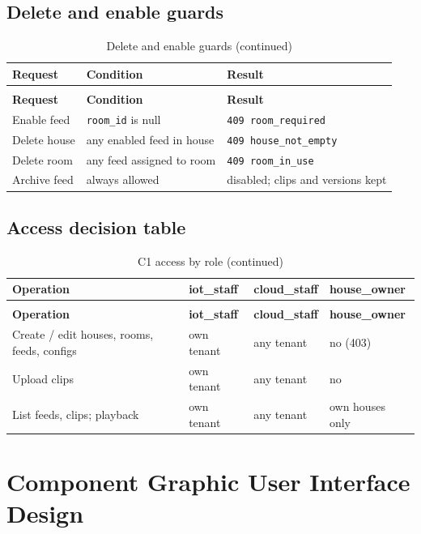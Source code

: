 \subsection{Delete and enable guards}
\begin{longtable}{L{4.4cm}L{5.0cm}L{5.2cm}}
\caption{Delete and enable guards}\label{tab:c1-dt-delete}\\
\toprule
\textbf{Request} & \textbf{Condition} & \textbf{Result} \\
\midrule
\endfirsthead
\caption[]{Delete and enable guards (continued)}\\
\toprule
\textbf{Request} & \textbf{Condition} & \textbf{Result} \\
\midrule
\endhead
Enable feed & \texttt{room\_id} is null & \texttt{409 room\_required} \\
Delete house & any enabled feed in house & \texttt{409 house\_not\_empty} \\
Delete room & any feed assigned to room & \texttt{409 room\_in\_use} \\
Archive feed & always allowed & disabled; clips and versions kept \\
\bottomrule
\end{longtable}

\subsection{Access decision table}
\begin{longtable}{L{5.2cm}L{3.0cm}L{3.0cm}L{3.4cm}}
\caption{C1 access by role}\\
\toprule
\textbf{Operation} & \textbf{iot\_staff} & \textbf{cloud\_staff} & \textbf{house\_owner} \\
\midrule
\endfirsthead
\caption[]{C1 access by role (continued)}\\
\toprule
\textbf{Operation} & \textbf{iot\_staff} & \textbf{cloud\_staff} & \textbf{house\_owner} \\
\midrule
\endhead
Create / edit houses, rooms, feeds, configs & own tenant & any tenant & no (403) \\
Upload clips & own tenant & any tenant & no \\
List feeds, clips; playback & own tenant & any tenant & own houses only \\
\bottomrule
\end{longtable}

\section{Component Graphic User Interface Design}

